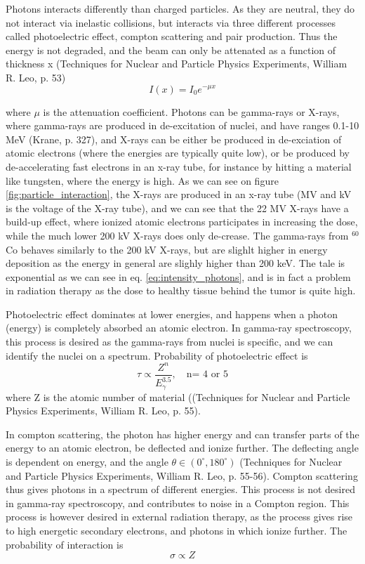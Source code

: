 \documentclass[a4paper,11pt,twoside]{book}
\begin{document}
Photons interacts differently than charged particles. As they are neutral, they do not interact via inelastic collisions, but interacts via three different processes called photoelectric effect, compton scattering and pair production. Thus the energy is not degraded, and the beam can only be attenated as a function of thickness x (Techniques for Nuclear and Particle Physics Experiments, William R. Leo, p. 53)
\begin{equation} \label{eq:intensity_photons}
    I(x) = I_0 e^{-\mu x}
\end{equation}

where $\mu$ is the attenuation coefficient. Photons can be gamma-rays or X-rays, where gamma-rays are produced in de-excitation of nuclei, and have ranges 0.1-10 MeV (Krane, p. 327), and X-rays can be either be produced in de-exciation of atomic electrons (where the energies are typically quite low), or be produced by de-accelerating fast electrons in an x-ray tube, for instance by hitting a material like tungsten, where the energy is high. As we can see on figure \ref{fig:particle_interaction}, the X-rays are produced in an x-ray tube (MV and kV is the voltage of the X-ray tube), and we can see that the 22 MV X-rays have a build-up effect, where ionized atomic electrons participates in increasing the dose, while the much lower 200 kV X-rays does only de-crease. The gamma-rays from $^{60}$Co behaves similarly to the 200 kV X-rays, but are slighlt higher in energy deposition as the energy in general are slighly higher than 200 keV. The tale is exponential as we can see in eq. \ref{eq:intensity_photons}, and is in fact a problem in radiation therapy as the dose to healthy tissue behind the tumor is quite high. 

Photoelectric effect dominates at lower energies, and happens when a photon (energy) is completely absorbed an atomic electron. In gamma-ray spectroscopy, this process is desired as the gamma-rays from nuclei is specific, and we can identify the nuclei on a spectrum. Probability of photoelectric effect is \begin{equation}
    \tau \propto \frac{Z^n}{E_\gamma^{3.5}}, \quad \text{n= 4 or 5}
\end{equation}
where Z is the atomic number of material ((Techniques for Nuclear and Particle Physics Experiments, William R. Leo, p. 55). 

In compton scattering, the photon has higher energy and can transfer parts of the energy to an atomic electron, be deflected and ionize further. The deflecting angle is dependent on energy, and the angle $\theta\in (0^\circ, 180^\circ)$ (Techniques for Nuclear and Particle Physics Experiments, William R. Leo, p. 55-56). Compton scattering thus gives photons in a spectrum of different energies. This process is not desired in gamma-ray spectroscopy, and contributes to noise in a Compton region. This process is however desired in external radiation therapy, as the process gives rise to high energetic secondary electrons, and photons in which ionize further. The probability of interaction is 
\begin{equation}
    \sigma \propto Z
\end{equation}
\end{document}

